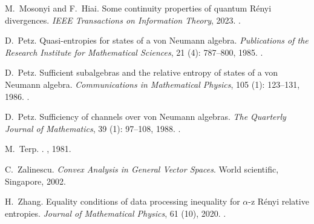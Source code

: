 \documentclass[12pt]{article}
\theoremstyle{definition}
\theoremstyle{remark}
\numberwithin{equation}{section}
\begin{document}
\begin{thebibliography}{24}
M.~Mosonyi and F.~Hiai.
\newblock Some continuity properties of quantum {R}ényi divergences.
\newblock \emph{IEEE Transactions on Information Theory}, 2023.
\newblock {}.

D.~Petz.
\newblock Quasi-entropies for states of a von {N}eumann algebra.
\newblock \emph{Publications of the Research Institute for Mathematical
  Sciences}, 21 (4): 787--800, 1985.
\newblock {}.

D.~Petz.
\newblock Sufficient subalgebras and the relative entropy of states of a von
  {Neumann} algebra.
\newblock \emph{Communications in Mathematical Physics}, 105
  (1): 123--131, 1986.
\newblock {}.

D.~Petz.
\newblock Sufficiency of channels over von {Neumann} algebras.
\newblock \emph{The Quarterly Journal of Mathematics}, 39
  (1): 97--108, 1988.
\newblock {}.

M.~Terp.
.
, {1981}.

C.~Zalinescu.
\newblock \emph{Convex Analysis in General Vector Spaces}.
\newblock World scientific, Singapore, 2002.

H.~Zhang.
\newblock Equality conditions of data processing inequality for $\alpha$-z
  {R}{\'e}nyi relative entropies.
\newblock \emph{Journal of Mathematical Physics}, 61 (10), 2020.
\newblock {}.

\end{thebibliography}


%
%
\end{document}
